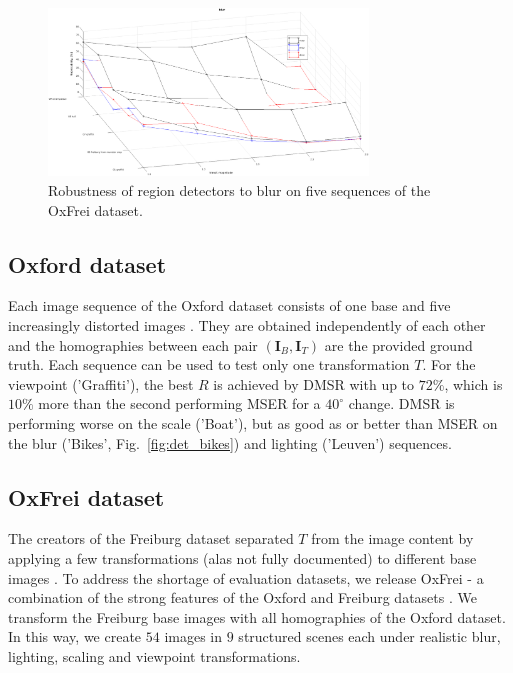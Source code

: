 \documentclass[conference,compsoc]{IEEEtran}
\def\I{{\mathbf I}}
\begin{document}
\begin{figure}[htb]

\begin{minipage}[b]{.9\linewidth}
  \centering
  \centerline{\includegraphics[width=8.5cm]{blur_some_combined}}
\end{minipage}
\hfill
\caption{Robustness of region detectors to blur on five sequences of the OxFrei dataset.}
\label{fig:blur}
%
\end{figure}
\subsection{Oxford dataset}
\label{ssec:oxford}
Each image sequence of the Oxford dataset consists of one base and five increasingly distorted images \cite{Mikolajczyk:2005}. They are obtained independently of each other and the homographies between each pair $(\I_B,\I_T)$ are the provided  ground truth. Each sequence can be used to test only one transformation $T$.
For the viewpoint ('Graffiti'), the best $R$ is achieved by DMSR with up to $72\%$, which is $10\%$ more than the second performing MSER for a $40^{\circ}$ change. DMSR is performing worse on the scale ('Boat'), but as good as or better than MSER on the blur ('Bikes', Fig.~\ref{fig:det_bikes}) and lighting ('Leuven') sequences.

\subsection{OxFrei dataset}
\label{ssec:combined}
The creators of the Freiburg dataset separated $T$ from the image content by applying a few transformations (alas not fully documented) to different base images \cite{FischerDB14}. To address the shortage of evaluation datasets, we release OxFrei - a combination of the strong features of the Oxford and Freiburg datasets \cite{elena_ranguelova_2016_45156}. We transform the Freiburg base images with all homographies of the Oxford dataset. In this way, we create $54$ images in $9$ structured scenes each under realistic blur, lighting, scaling and viewpoint transformations.
\end{document}
